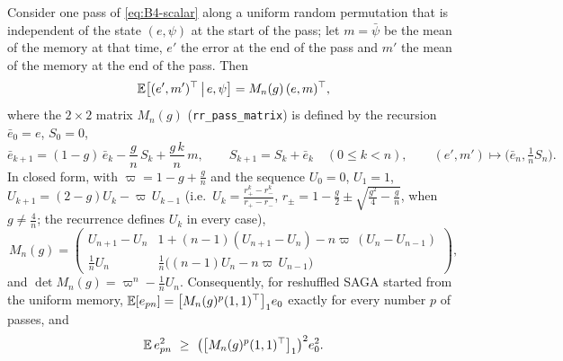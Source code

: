 \begin{proposition}\label{prop:B4-rr}
Consider one pass of \eqref{eq:B4-scalar} along a uniform random permutation that is independent of the state $(e,\psi)$ at the start of the pass; let $m=\bar\psi$ be the mean of the memory at that time, $e'$ the error at the end of the pass and $m'$ the mean of the memory at the end of the pass. Then
\[
\mathbb{E}\big[(e',m')^\top\,\big|\,e,\psi\big]=M_n(g)\,(e,m)^\top ,
\]
where the $2\times2$ matrix $M_n(g)$ (\texttt{rr\_pass\_matrix}) is defined by the recursion $\bar e_0=e$, $S_0=0$,
\begin{equation}\label{eq:B4-rr-rec}
\bar e_{k+1}=(1-g)\,\bar e_k-\frac gn\,S_k+\frac{g\,k}n\,m,\qquad S_{k+1}=S_k+\bar e_k\quad(0\le k<n),\qquad (e',m')\mapsto\big(\bar e_n,\tfrac1nS_n\big).
\end{equation}
In closed form, with $\varpi=1-g+\frac gn$ and the sequence $U_0=0$, $U_1=1$, $U_{k+1}=(2-g)U_k-\varpi\,U_{k-1}$ (i.e.\ $U_k=\frac{r_+^k-r_-^k}{r_+-r_-}$, $r_\pm=1-\frac g2\pm\sqrt{\frac{g^2}4-\frac gn}$, when $g\ne\frac4n$; the recurrence defines $U_k$ in every case),
\begin{equation}\label{eq:B4-rr-closed}
M_n(g)=\begin{pmatrix}U_{n+1}-U_n & 1+(n-1)(U_{n+1}-U_n)-n\varpi\,(U_n-U_{n-1})\\[2pt] \frac1nU_n & \frac1n\big((n-1)U_n-n\varpi\,U_{n-1}\big)\end{pmatrix},
\end{equation}
and $\det M_n(g)=\varpi^n-\frac1nU_n$.
Consequently, for reshuffled SAGA started from the uniform memory, $\mathbb{E}[e_{pn}]=\big[M_n(g)^p(1,1)^\top\big]_1e_0$ exactly for every number $p$ of passes, and
\begin{equation}\label{eq:B4-rr-jensen}
\mathbb{E}\,e_{pn}^2\ \ge\ \big(\big[M_n(g)^p(1,1)^\top\big]_1\big)^2e_0^2 .
\end{equation}
\end{proposition}
